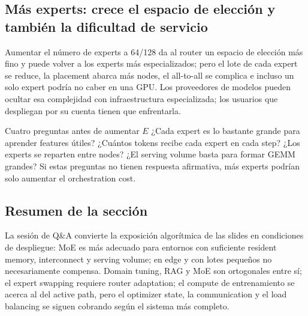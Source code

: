 
\subsection{Más experts: crece el espacio de elección y también la dificultad de servicio}

Aumentar el número de experts a 64/128 da al router un espacio de elección más fino y puede volver a los experts más especializados; pero el lote de cada expert se reduce, la placement abarca más nodes, el all-to-all se complica e incluso un solo expert podría no caber en una GPU. Los proveedores de modelos pueden ocultar esa complejidad con infraestructura especializada; los usuarios que despliegan por su cuenta tienen que enfrentarla.

\begin{importantbox}{Cuatro preguntas antes de aumentar $E$}
¿Cada expert es lo bastante grande para aprender features útiles? ¿Cuántos tokens recibe cada expert en cada step? ¿Los experts se reparten entre nodes? ¿El serving volume basta para formar GEMM grandes? Si estas preguntas no tienen respuesta afirmativa, más experts podrían solo aumentar el orchestration cost.
\end{importantbox}


\subsection{Resumen de la sección}

La sesión de Q\&A convierte la exposición algorítmica de las slides en condiciones de despliegue: MoE es más adecuado para entornos con suficiente resident memory, interconnect y serving volume; en edge y con lotes pequeños no necesariamente compensa. Domain tuning, RAG y MoE son ortogonales entre sí; el expert swapping requiere router adaptation; el compute de entrenamiento se acerca al del active path, pero el optimizer state, la communication y el load balancing se siguen cobrando según el sistema más completo.
